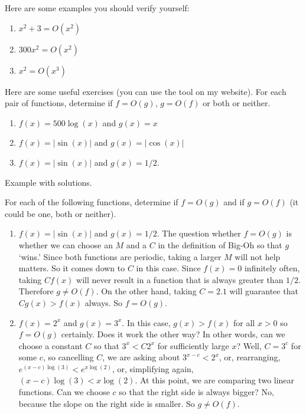 \documentclass{article}
\theoremstyle{plain}
\theoremstyle{definition}
\theoremstyle{remark}
\numberwithin{theorem}{section}
\newcommand{\bespokedemo}[1]{\href{bespoke:#1}{\textsf{[\,interactive: #1\,]}}}
\newif\ifweb \webfalse
\DeclareRobustCommand{\webonly}[1]{\ifweb#1\fi}
\DeclareRobustCommand{\printonly}[1]{\ifweb\else#1\fi}
\begin{document}
Here are some examples you should verify yourself:
\begin{enumerate}
	\item $x^2 + 3 = O(x^2)$
	\item $300x^2 = O(x^2)$
	\item $x^2 = O(x^3)$
\end{enumerate}

Here are some useful exercises (\printonly{you can use the tool on my website}\webonly{you can use the Big-Oh Explorer below}).  For each pair of functions, determine if $f = O(g)$, $g = O(f)$ or both or neither.
\begin{enumerate}
	\item $f(x) = 500 \log (x)$ and $g(x) = x$
	\item $f(x) = |\sin(x)|$ and $g(x) = |\cos(x)|$
	\item $f(x) = |\sin(x)|$ and $g(x) = 1/2$.
\end{enumerate}

\webonly{\bespokedemo{big-oh-tool}}

Example with solutions. 

For each of the following functions, determine if $f = O(g)$ and if $g = O(f)$ (it could be one, both or neither).

\begin{enumerate}
	\item $f(x) = |\sin(x)|$ and $g(x) = 1/2$.  The question whether $f = O(g)$ is whether we can choose an $M$ and a $C$ in the definition of Big-Oh so that $g$ `wins.'  Since both functions are periodic, taking a larger $M$ will not help matters.  So it comes down to $C$ in this case.  Since $f(x) = 0$ infinitely often, taking $C f(x)$ will never result in a function that is always greater than $1/2$.  Therefore $g \neq O(f)$.  On the other hand, taking $C = 2.1$ will guarantee that $C g(x) > f(x)$ always.  So $f = O(g)$.
	\item $f(x) = 2^x$ and $g(x) = 3^x$.  In this case, $g(x) > f(x)$ for all $x > 0$ so $f = O(g)$ certainly.  Does it work the other way?  In other words, can we choose a constant $C$ so that $3^x < C 2^x$ for sufficiently large $x$?  Well, $C = 3^c$ for some $c$, so cancelling $C$, we are asking about $3^{x-c} < 2^x$, or, rearranging, $e^{(x-c)\log(3)} < e^{x \log(2)}$, or, simplifying again, $(x-c)\log(3) < x \log (2)$.  At this point, we are comparing two linear functions.  Can we choose $c$ so that the right side is always bigger?  No, because the slope on the right side is smaller.  So $g \neq O(f)$.
\end{enumerate}
\end{document}
